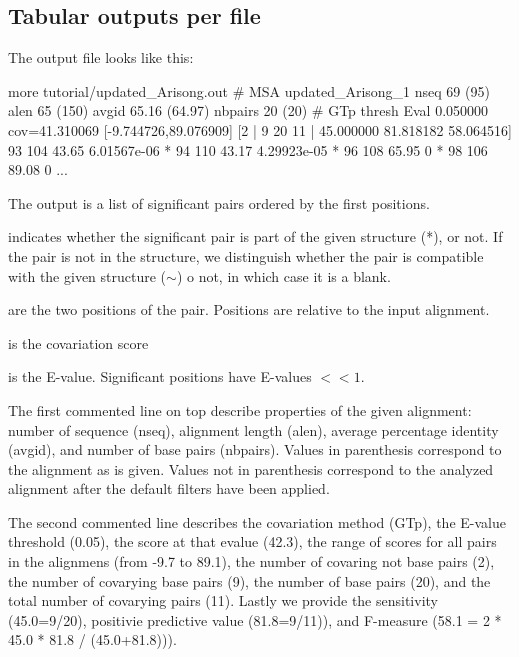 \subsection{Tabular outputs per file}

The  output file looks like this:

\begin{sreoutput}
more tutorial/updated_Arisong.out 
# MSA updated_Arisong_1 nseq 69 (95) alen 65 (150) avgid 65.16 (64.97) nbpairs 20 (20)
# GTp thresh Eval 0.050000 cov=41.310069 [-9.744726,89.076909] [2 | 9 20 11 | 45.000000 81.818182 58.064516] 
                93             104      43.65   6.01567e-06
*               94             110      43.17   4.29923e-05
*               96             108      65.95   0
*               98             106      89.08   0
...
\end{sreoutput}
The output is a list of significant pairs ordered by the first positions. \\

\begin{sreitems}{}
\item[\emprog{First column}] indicates whether the significant pair is
  part of the given structure (*), or not.  If the pair is not in the
  structure, we distinguish whether the pair is compatible with the
  given structure ($\sim$) o not, in which case it is a blank.

\item[\emprog{Second and third columns}] are the two positions of the
  pair. Positions are relative to the input alignment.

\item[\emprog{Forth column}] is the covariation score

\item[\emprog{Fifth column}] is the E-value. Significant positions
  have E-values $<< 1$.
\end{sreitems}

The first commented line on top describe properties of the given
alignment: number of sequence (nseq), alignment length (alen), average
percentage identity (avgid), and number of base pairs (nbpairs).
Values in parenthesis correspond to the alignment as is given. Values
not in parenthesis correspond to the analyzed alignment after the
default filters have been applied.

The second commented line describes the covariation method (GTp), the
E-value threshold (0.05), the score at that evalue (42.3), the range
of scores for all pairs in the alignmens (from -9.7 to 89.1), the
number of covaring not base pairs (2), the number of covarying base
pairs (9), the number of base pairs (20), and the total number of
covarying pairs (11). Lastly we provide the sensitivity (45.0=9/20),
positivie predictive value (81.8=9/11)), and F-measure (58.1 = 2 *
45.0 * 81.8 / (45.0+81.8))).\\

